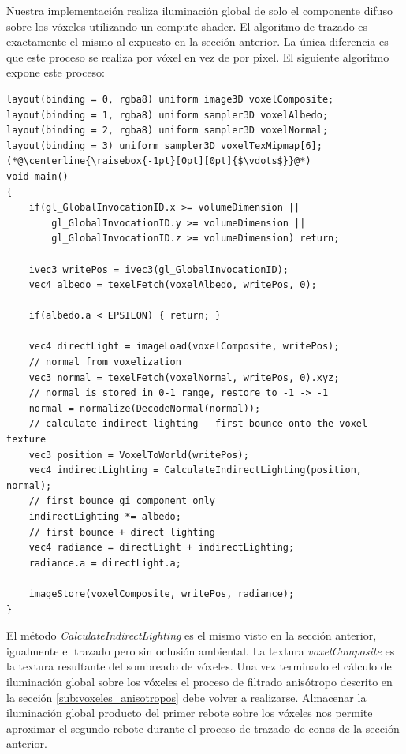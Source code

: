 Nuestra implementación realiza iluminación global de solo el componente difuso sobre los vóxeles utilizando un compute shader. El algoritmo de trazado es exactamente el mismo al expuesto en la sección anterior. La única diferencia es que este proceso se realiza por vóxel en vez de por pixel. El siguiente algoritmo expone este proceso:
\\
\begin{lstlisting}[caption={Iluminacion global sobre voxeles.}, label=VoxelGI]
layout(binding = 0, rgba8) uniform image3D voxelComposite;
layout(binding = 1, rgba8) uniform sampler3D voxelAlbedo;
layout(binding = 2, rgba8) uniform sampler3D voxelNormal;
layout(binding = 3) uniform sampler3D voxelTexMipmap[6];
(*@\centerline{\raisebox{-1pt}[0pt][0pt]{$\vdots$}}@*)
void main()
{
    if(gl_GlobalInvocationID.x >= volumeDimension ||
        gl_GlobalInvocationID.y >= volumeDimension ||
        gl_GlobalInvocationID.z >= volumeDimension) return;

    ivec3 writePos = ivec3(gl_GlobalInvocationID);
    vec4 albedo = texelFetch(voxelAlbedo, writePos, 0);

    if(albedo.a < EPSILON) { return; }

    vec4 directLight = imageLoad(voxelComposite, writePos);
    // normal from voxelization
    vec3 normal = texelFetch(voxelNormal, writePos, 0).xyz;
    // normal is stored in 0-1 range, restore to -1 -> -1
    normal = normalize(DecodeNormal(normal));
    // calculate indirect lighting - first bounce onto the voxel texture
    vec3 position = VoxelToWorld(writePos);
    vec4 indirectLighting = CalculateIndirectLighting(position, normal);
    // first bounce gi component only
    indirectLighting *= albedo;
    // first bounce + direct lighting
    vec4 radiance = directLight + indirectLighting;
    radiance.a = directLight.a;

    imageStore(voxelComposite, writePos, radiance);
}
\end{lstlisting}
El método \emph{CalculateIndirectLighting} es el mismo visto en la sección anterior, igualmente el trazado pero sin oclusión ambiental. La textura \emph{voxelComposite} es la textura resultante del sombreado de vóxeles. Una vez terminado el cálculo de iluminación global sobre los vóxeles el proceso de filtrado anisótropo descrito en la sección \ref{sub:voxeles_anisotropos} debe volver a realizarse. Almacenar la iluminación global producto del primer rebote sobre los vóxeles nos permite aproximar el segundo rebote durante el proceso de trazado de conos de la sección anterior.

